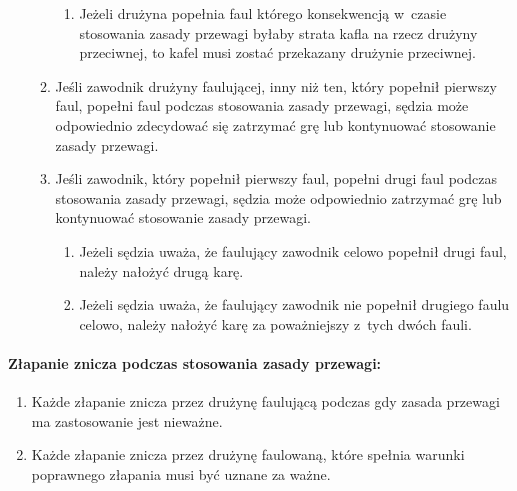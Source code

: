 \documentclass[12pt,a4paper]{article}
\begin{document}
\begin{enumerate}
\begin{enumerate}
		            \begin{enumerate}
			            \item
			                  Jeżeli drużyna popełnia faul którego konsekwencją w~czasie
			                  stosowania zasady przewagi byłaby strata kafla na rzecz drużyny
			                  przeciwnej, to kafel musi zostać przekazany drużynie
			                  przeciwnej.
		            \end{enumerate}
		      \item
		            Jeśli zawodnik drużyny faulującej, inny niż ten, który popełnił
		            pierwszy faul, popełni faul podczas stosowania zasady przewagi,
		            sędzia może odpowiednio zdecydować się zatrzymać grę lub kontynuować
		            stosowanie zasady przewagi.
		      \item
		            Jeśli zawodnik, który popełnił pierwszy faul, popełni drugi faul
		            podczas stosowania zasady przewagi, sędzia może odpowiednio
		            zatrzymać grę lub kontynuować stosowanie zasady przewagi.

		            \begin{enumerate}
			            \item
			                  Jeżeli sędzia uważa, że faulujący zawodnik celowo popełnił drugi
			                  faul, należy nałożyć drugą karę.
			            \item
			                  Jeżeli sędzia uważa, że faulujący zawodnik nie popełnił drugiego
			                  faulu celowo, należy nałożyć karę za poważniejszy z~tych dwóch
			                  fauli.
		            \end{enumerate}
	      \end{enumerate}
\end{enumerate}

\paragraph{Złapanie znicza podczas stosowania zasady przewagi:}

\begin{enumerate}
	\item
	      Każde złapanie znicza przez drużynę faulującą podczas gdy zasada
	      przewagi ma zastosowanie jest nieważne.
	\item
	      Każde złapanie znicza przez drużynę faulowaną, które spełnia warunki
	      poprawnego złapania musi być uznane za ważne.
\end{enumerate}
\end{document}
